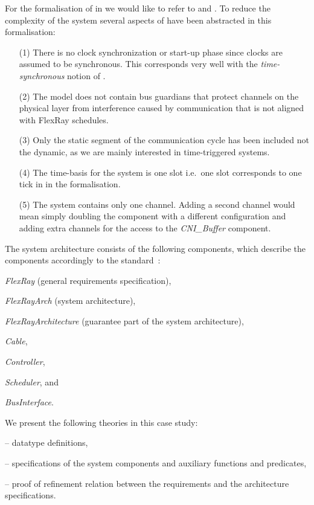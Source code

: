 For the formalisation of \fr in \Focus we would like to refer to  \cite{efts_book} and \cite{spichkova}. 
To reduce the complexity of the system several aspects of \fr have been abstracted in this formalisation:
%
\begin{itemize}
\item[(1)] There is no clock synchronization or start-up phase since clocks are assumed to be synchronous. 
This corresponds very well with the \emph{time-synchronous} notion of \Focus.
%
\item[(2)] The model does not contain bus guardians that protect channels on the physical layer from interference caused by communication that is not aligned with FlexRay schedules.
%
\item[(3)] Only the static segment of the communication cycle has been included not the dynamic, 
as we are mainly interested in time-triggered systems.
%
\item[(4)] The time-basis for the system is one slot i.e.\ one slot \fr corresponds to one tick in in the formalisation.
%
\item[(5)] The system contains only one \fr channel. Adding a second channel 
would mean simply doubling the \fr component with a different configuration 
and adding extra channels for the access to the \emph{CNI\_Buffer} component.
\end{itemize}
% 
The system architecture consists of the following components, 
which describe the \fr components accordingly to the \fr standard~\cite{FlexRayProt}: 
%
\begin{itemize*}
  \item \emph{FlexRay} (general requirements specification), 
  \item \emph{FlexRayArch} (system architecture),   
  \item \emph{FlexRayArchitecture} 
(guarantee part of the system architecture), 
  \item \emph{Cable}, 
  \item \emph{Controller}, 
  \item \emph{Scheduler}, and 
  \item \emph{BusInterface}. 
  \end{itemize*}
We present the following \isah theories in this case study:
%
\begin{itemize*}
  \item {} -- datatype definitions, 
  \item {} --  specifications of the system components and auxiliary functions and predicates, 
  \item {} --   proof of refinement relation between the requirements and the architecture specifications.
\end{itemize*}
